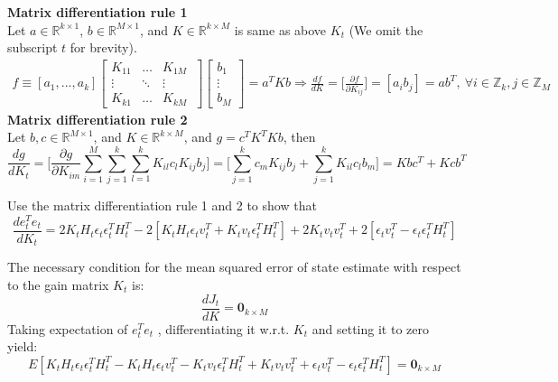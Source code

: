 \documentclass[a4 paper]{article}
\begin{document}
\begin{tcolorbox}[colback=RoyalBlue!5!white,colframe=RoyalBlue!75!black]%
\textbf{Matrix differentiation rule 1}\\
Let $a\in\mathbb{R}^{k\times1}$, $b\in\mathbb{R}^{M\times1}$, and $K\in\mathbb{R}^{k\times M}$ is same as above $K_t$ (We omit the subscript $t$ for brevity).
    \begin{align}
        f\equiv[a_1,...,a_k]\begin{bmatrix}
        K_{11}& \dots & K_{1M}\\
        \vdots& \ddots & \vdots\\
        K_{k1}& \dots & K_{kM}\
        \end{bmatrix}\begin{bmatrix}
        b_1\\\vdots\\b_M
        \end{bmatrix}=a^TKb\Rightarrow\frac{df}{dK}=\Big[\frac{\partial f}{\partial K_{ij}}\Big]=[a_ib_j]=ab^T, \ \forall i\in\mathbb{Z}_{k}, j\in\mathbb{Z}_{M}
    \end{align}
\tcblower
\textbf{Matrix differentiation rule 2}\\
Let $ b,c\in\mathbb{R}^{M\times1}$, and $ K\in\mathbb{R}^{k\times M}$, and $g=c^TK^TKb$, then
\begin{equation}
    \frac{dg}{dK_t}=\Big[\frac{\partial g}{\partial K_{im}}\sum_{i=1}^M\sum_{j=1}^k\sum_{l=1}^k K_{il}c_lK_{ij}b_j\Big]=\Big[\sum_{j=1}^k c_mK_{ij}b_j+\sum_{j=1}^k K_{il}c_lb_m\Big]=Kbc^T+Kcb^T
\end{equation}
\end{tcolorbox}
\begin{tcolorbox}[colback=RubineRed!5!white,colframe=RubineRed!75!black]
\problem{2}{15}
Use the matrix differentiation rule 1 and 2 to show that
\begin{equation}
    \frac{de_t^Te_t}{dK_t}=2K_tH_t\epsilon_t\epsilon_t^TH_t^T -2[K_tH_t\epsilon_{t}v_t^T + K_tv_t\epsilon_t^TH^T_t ] + 2K_tv_tv_t^T + 2[\epsilon_tv^T_t- \epsilon_t\epsilon_t^TH^T_t ]
\end{equation}
\end{tcolorbox}
The necessary condition for the mean squared error of state estimate with respect to the gain matrix $K_t$ is:
$$\frac{dJ_t}{dK}=\textbf{0}_{k\times M}$$
Taking expectation of $e_t^Te_t$ , differentiating it w.r.t. $K_t$ and setting it to zero yield:
\begin{equation}
    E[K_tH_t\epsilon_t\epsilon_t^TH_t^T -K_tH_t\epsilon_{t}v_t^T - K_tv_t\epsilon_t^TH^T_t + K_tv_tv_t^T + \epsilon_tv^T_t- \epsilon_t\epsilon_t^TH^T_t]=\textbf{0}_{k\times M}
\end{equation}
\end{document}
